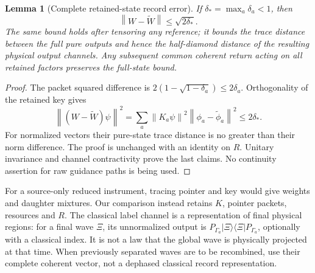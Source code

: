 \documentclass[11pt]{article}
\newtheorem{lemma}[theorem]{Lemma}
\theoremstyle{definition}\newtheorem{assumption}[theorem]{Constitutive assumption}
\theoremstyle{remark}\newtheorem{remark}[theorem]{Remark}
\newcommand{\ket}[1]{|#1\rangle}\newcommand{\bra}[1]{\langle#1|}
\newcommand{\norm}[1]{\left\|#1\right\|}\newcommand{\pos}[1]{[#1]_+}
\begin{document}
\begin{lemma}[Complete retained-state record error]\label{lem:instrument}
If $\delta_* =\max_a\delta_a<1$, then
\begin{equation}\label{eq:isometryerror}
 \norm{W-\widetilde W}\le\sqrt{2\delta_*}.
\end{equation}
The same bound holds after tensoring any reference; it bounds the trace distance between the full pure outputs and hence the half-diamond distance of the resulting physical output channels. Any subsequent \emph{common} coherent return acting on all retained factors preserves the full-state bound.
\end{lemma}
\begin{proof}
The packet squared difference is $2(1-\sqrt{1-\delta_a})\le2\delta_a$. Orthogonality of the retained key gives
\[
 \norm{(W-\widetilde W)\psi}^2
 =\sum_a\norm{K_a\psi}^2\norm{\phi_a-\widetilde\phi_a}^2\le2\delta_*.
\]
For normalized vectors their pure-state trace distance is no greater than their norm difference. The proof is unchanged with an identity on $R$. Unitary invariance and channel contractivity prove the last claims. No continuity assertion for raw guidance paths is being used.
\end{proof}

For a source-only reduced instrument, tracing pointer and key would give weights and daughter mixtures. Our comparison instead retains $K$, pointer packets, resources and $R$. The classical label channel is a representation of final physical regions: for a final wave $\Xi$, its unnormalized output is $P_{\Gamma_a}\ket\Xi\bra\Xi P_{\Gamma_a}$, optionally with a classical index. It is not a law that the global wave is physically projected at that time. When previously separated waves are to be recombined, use their complete coherent vector, not a dephased classical record representation.
\end{document}
